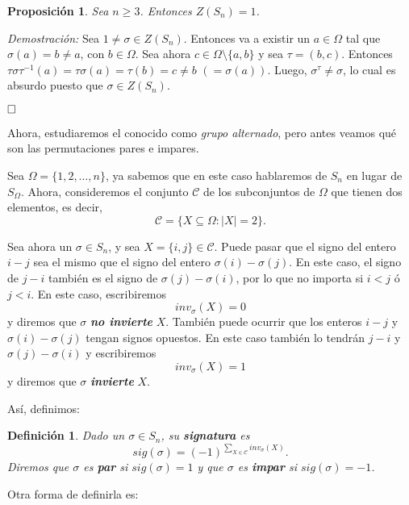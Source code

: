\documentclass[12pt]{article}
\newtheorem{proposition}[theorem]{Proposición}
\newtheorem{definition}[theorem]{Definición}
\begin{document}
\begin{proposition} Sea $n \geq 3$. Entonces $Z(S_{n}) =1$.
\end{proposition}
\emph{Demostración: }
Sea $1 \neq \sigma \in Z(S_{n})$. Entonces va a existir un $a \in \Omega$ tal que $\sigma (a)= b \neq a$, con $b \in \Omega$. Sea ahora $c \in \Omega \setminus \lbrace a,b \rbrace$ y sea $\tau =(b,c)$. Entonces $\tau\sigma \tau^{-1} (a)= \tau \sigma (a) =\tau (b) = c \neq b$ $(=\sigma(a))$. Luego, $\sigma^{\tau} \neq \sigma$, lo cual es absurdo puesto que $\sigma \in Z(S_{n})$.

$\hfill \square$

Ahora, estudiaremos el conocido como \textit{grupo alternado}, pero antes veamos qué son las permutaciones pares e impares.

Sea $\Omega = \lbrace 1, 2, \ldots, n \rbrace$, ya sabemos que en este caso hablaremos de $S_n$ en lugar de $S_\Omega$. Ahora, consideremos el conjunto $\mathcal{C}$ de los subconjuntos de $\Omega$ que tienen dos elementos, es decir, $$\mathcal{C} = \lbrace X \subseteq \Omega : |X| = 2 \rbrace.$$

Sea ahora un $\sigma \in S_n$, y sea $X = \lbrace i,j \rbrace \in \mathcal{C}$. Puede pasar que el signo del entero $i-j$ sea el mismo que el signo del entero $\sigma(i)-\sigma(j)$. En este caso, el signo de $j-i$ también es el signo de $\sigma(j) - \sigma(i)$, por lo que no importa si $i<j$ ó $j<i$. En este caso, escribiremos $$inv_\sigma(X)=0$$ y diremos que $\sigma$ \textbf{\textit{no invierte}} $X$. También puede ocurrir que los enteros $i-j$ y $\sigma(i)-\sigma(j)$ tengan signos opuestos. En este caso también lo tendrán $j-i$ y $\sigma(j) -\sigma(i)$ y escribiremos $$inv_\sigma(X) = 1$$ y diremos que $\sigma$ \textbf{\textit{invierte}} $X$. 

Así, definimos:

\begin{definition}Dado un $\sigma \in S_n$, su \textbf{signatura} es $$sig(\sigma) = (-1)^{\sum_{X\in \mathcal{C}}inv_\sigma(X)}.$$
Diremos que $\sigma$ es \textbf{par} si $sig(\sigma)=1$ y que $\sigma$ es \textbf{impar} si $sig(\sigma)=-1$.
\end{definition}

Otra forma de definirla es:
\end{document}
